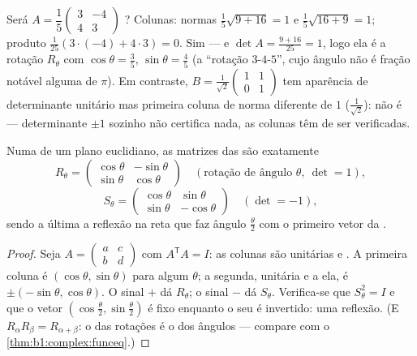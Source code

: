 \begin{example}
\label{ex:b1:euclid:recognize}
Será $A = \dfrac15\begin{pmatrix} 3 & -4\\ 4 & 3\end{pmatrix}$ ? Colunas: normas $\frac15\sqrt{9 + 16} = 1$ e $\frac15\sqrt{16 + 9} = 1$; produto $\frac1{25}(3\cdot(-4) +
4\cdot3) = 0$.
Sim --- e $\det A = \frac{9 + 16}{25} = 1$, logo ela é a rotação $R_\theta$ com $\cos\theta = \frac35$, $\sin\theta = \frac45$ (a
``rotação $3$-$4$-$5$'', cujo ângulo não é fração notável alguma de
$\pi$). Em contraste, $B =
\frac{1}{\sqrt2}\begin{pmatrix} 1 & 1\\ 0 & 1\end{pmatrix}$ tem aparência de determinante unitário
mas primeira coluna de norma diferente de $1$ ($\frac1{\sqrt2}$): não é
 --- determinante $\pm1$ sozinho não certifica nada, as
colunas têm de ser verificadas.
\end{example}

\begin{theorem}\label{thm:b1:euclid:plane}
Numa   de um plano euclidiano, as matrizes das
 são exatamente
\[
R_\theta = \begin{pmatrix}
\cos\theta & -\sin\theta\\ \sin\theta & \cos\theta
\end{pmatrix}
\quad (\text{rotação de ângulo } \theta,\ \det = 1),
\]
\[
S_\theta = \begin{pmatrix}
\cos\theta & \sin\theta\\ \sin\theta & -\cos\theta
\end{pmatrix}
\quad (\det = -1),
\]
sendo a última a reflexão na reta que faz ângulo $\frac\theta2$ com o
primeiro vetor da .
\end{theorem}

\begin{proof}
Seja $A = \begin{pmatrix} a & c\\ b & d\end{pmatrix}$ com $A^{\mathsf T}A = I$: as colunas são unitárias e . A
primeira coluna é $(\cos\theta, \sin\theta)$ para algum $\theta$; a segunda, unitária e
 a ela, é $\pm(-\sin\theta, \cos\theta)$. O sinal $+$ dá $R_\theta$; o sinal $-$ dá
$S_\theta$. Verifica-se que $S_\theta^2 = I$ e que o vetor $(\cos\frac\theta2,
\sin\frac\theta2)$ é fixo enquanto o
seu  é invertido: uma reflexão. (E $R_\alpha R_\beta = R_{\alpha+\beta}$: o  das
rotações é o  dos ângulos --- compare com o \cref{thm:b1:complex:funceq}.)
\end{proof}

